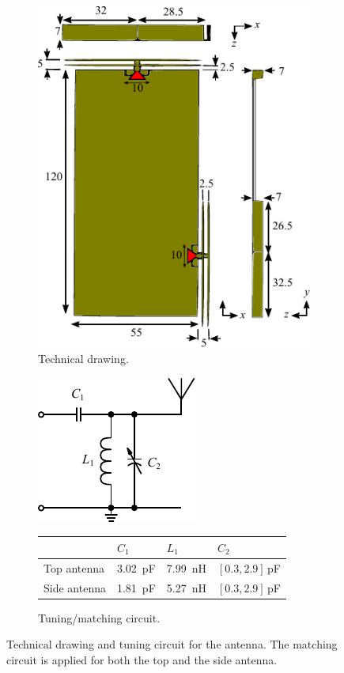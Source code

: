 \begin{figure}[htbp]
    \begin{subfigure}[t]{0.49\linewidth}
        \centering
        \includegraphics{img/tech_sol/monopole/highband/3d_drawing}
        \caption{Technical drawing.}
        \label{fig:ant1technical_highband}
    \end{subfigure}
    \hfill
    \begin{subfigure}[t]{0.49\linewidth}
        \centering
        \includegraphics{img/tech_sol/schematic_tuning_1}\\[1cm]
\footnotesize
        \begin{tabular}{|l|l|l|l|}
            \hline
            & $C_1$ & $L_1$ & $C_2$ \\
            \hline
            Top antenna & \SI{3.02}{pF} & \SI{7.99}{nH} & $[0.3,2.9]\,$pF\\
            Side antenna & \SI{1.81}{pF} & \SI{5.27}{nH} & $[0.3,2.9]\,$pF\\
            \hline
        \end{tabular}
        \caption{Tuning/matching circuit.}
        \label{fig:ant1_tuning_highband}
    \end{subfigure}
    \caption{Technical drawing and tuning circuit for the antenna. The matching circuit is applied for both the top and the side antenna.}
    \label{fig:sparam_5mm_highband}
\end{figure}

